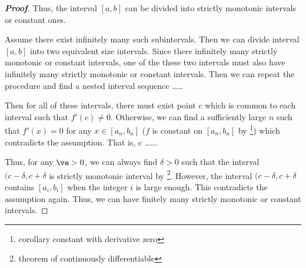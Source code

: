 \begin{proof}[\bf Proof]
Thus, the interval $[a,b]$ can be divided into strictly monotonic intervals or constant ones.

Assume there exist infinitely many such subintervals. Then we can divide interval $[a,b]$ into two equivalent size intervals. Since there infinitely many strictly monotonic or constant intervals, one of the these two intervals must also have infinitely many strictly monotonic or constant intervals. Then we can repeat the procedure and find a nested interval sequence
\be
[a,b] \supseteq [a_1,b_1] \supseteq \dots \supseteq [a_n,b_n] \supseteq \dots
\ee

Then for all of these intervals, there must exist point $c$ which is common to each interval such that $f'(c)\neq 0$. Otherwise, we can find a sufficiently large $n$ such that $f'(x)=0$ for any $x\in [a_n,b_n]$ ($f$ is constant on $[a_n,b_n]$ by \footnote{corollary constant with derivative zero}) which contradicts the assumption. That is,
\be
c \in \dots \subseteq [a_n,b_n] \subseteq  \dots \subseteq [a_1,b_1] \subseteq [a,b].
\ee

Thus, for any $\ve>0$, we can always find $\delta >0$ such that the interval $(c-\delta,c+\delta$ is strictly monotonic interval by \footnote{theorem of continuously differentiable}. However, the interval $(c-\delta,c+\delta$ contains $[a_i,b_i]$ when the integer $i$ is large enough. This contradicts the assumption again. Thus, we can have finitely many strictly monotonic or constant intervals.%
\end{proof}





